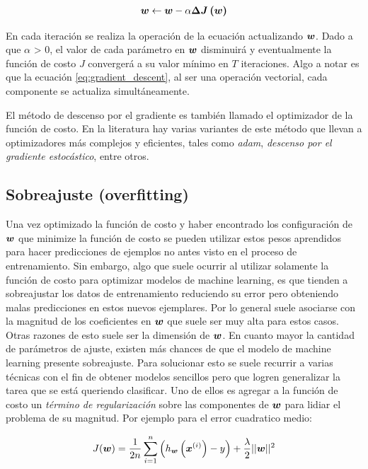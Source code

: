 \begin{align} \label{eq:gradient_descent}
    \boldsymbol{w} \leftarrow \boldsymbol{w} - \alpha \boldsymbol{\Delta J\left( w \right)}
\end{align}

En cada iteración se realiza la operación de la ecuación actualizando
$\boldsymbol{w}$. Dado a que $\alpha$ > 0, el valor de cada parámetro en $\boldsymbol{w}$ disminuirá
y eventualmente la función de costo $J$ convergerá a su valor mínimo en $T$
iteraciones. Algo a notar es que la ecuación \ref{eq:gradient_descent}, al ser una operación vectorial, cada componente se actualiza simultáneamente.

El método de descenso por el gradiente es también llamado el
optimizador de la función de costo. En la literatura hay varias variantes de
este método que llevan a optimizadores más complejos y eficientes, tales como
\emph{adam}, \emph{descenso por el gradiente estocástico}, entre otros.

\subsection{Sobreajuste (overfitting)}

Una vez optimizado la función de costo y haber encontrado los configuración de
$\boldsymbol{w}$ que minimize la función de costo se pueden utilizar estos pesos
aprendidos para hacer predicciones de ejemplos no antes visto en el proceso de
entrenamiento. Sin embargo, algo que suele ocurrir al utilizar solamente la
función de costo para optimizar modelos de machine learning, es que tienden a
sobreajustar los datos de entrenamiento reduciendo su error pero obteniendo
malas predicciones en estos nuevos ejemplares. Por lo general suele asociarse
con la magnitud de los coeficientes en $\boldsymbol{w}$ que suele ser muy alta para
estos casos. Otras razones de esto suele ser la dimensión de $\boldsymbol{w}$. En
cuanto mayor la cantidad de parámetros de ajuste, existen más chances de que el
modelo de machine learning presente sobreajuste. Para solucionar esto se suele
recurrir a varias técnicas con el fin de obtener modelos sencillos pero que
logren generalizar la tarea que se está queriendo clasificar. Uno de ellos es
agregar a la función de costo un \emph{término de regularización} sobre las
componentes de $\boldsymbol{w}$ para lidiar el problema de su magnitud. Por ejemplo para
el error cuadratico medio:

\begin{align}
    J(\boldsymbol{w}) = \frac{1}{2n} \sum_{i=1}^{n}\left( h_{\boldsymbol{w}}\left( \boldsymbol{x}^{(i)}\right) - y \right) +
                  \frac{\lambda}{2} ||\boldsymbol{w}||^{2}
\end{align}

